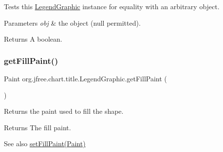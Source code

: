 Tests this {\ttfamily \mbox{\hyperlink{classorg_1_1jfree_1_1chart_1_1title_1_1_legend_graphic}{Legend\+Graphic}}} instance for equality with an arbitrary object.


\begin{DoxyParams}{Parameters}
{\em obj} & the object ({\ttfamily null} permitted).\\
\hline
\end{DoxyParams}
\begin{DoxyReturn}{Returns}
A boolean. 
\end{DoxyReturn}
\mbox{\label{classorg_1_1jfree_1_1chart_1_1title_1_1_legend_graphic_aa60ec88ec6d9bf1897d052aed4ca688a}} 
\subsubsection{\texorpdfstring{get\+Fill\+Paint()}{getFillPaint()}}
{\footnotesize\ttfamily Paint org.\+jfree.\+chart.\+title.\+Legend\+Graphic.\+get\+Fill\+Paint (\begin{DoxyParamCaption}{ }\end{DoxyParamCaption})}

Returns the paint used to fill the shape.

\begin{DoxyReturn}{Returns}
The fill paint.
\end{DoxyReturn}
\begin{DoxySeeAlso}{See also}
\mbox{\hyperlink{classorg_1_1jfree_1_1chart_1_1title_1_1_legend_graphic_a3c8d58ed6cc6ea596e53f3ae782ae84a}{set\+Fill\+Paint(\+Paint)}} 
\end{DoxySeeAlso}
\mbox{\label{classorg_1_1jfree_1_1chart_1_1title_1_1_legend_graphic_ae51819918572b58034792a02bc865bd3}} 
